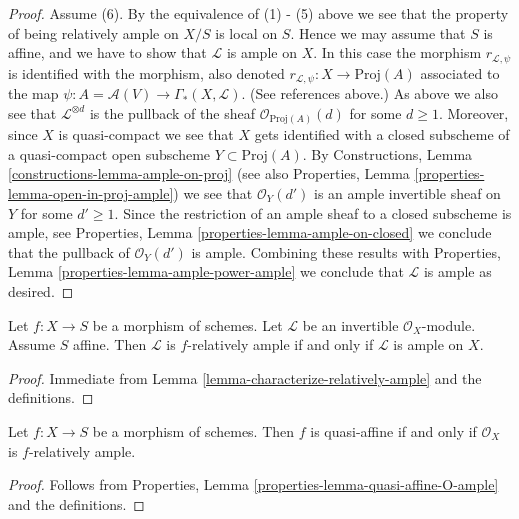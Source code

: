\begin{proof}
\medskip\noindent
Assume (6). By the equivalence of (1) - (5) above we see that the
property of being relatively ample on $X/S$ is local on $S$. Hence
we may assume that $S$ is affine, and we have to show that
$\mathcal{L}$ is ample on $X$. In this case the morphism
$r_{\mathcal{L}, \psi}$ is identified with the morphism, also denoted
$r_{\mathcal{L}, \psi} : X \to \text{Proj}(A)$ associated to the map
$\psi : A = \mathcal{A}(V) \to \Gamma_*(X, \mathcal{L})$.
(See references above.) As above we also see that
$\mathcal{L}^{\otimes d}$ is the pullback of the sheaf
$\mathcal{O}_{\text{Proj}(A)}(d)$ for some $d \geq 1$.
Moreover, since $X$ is quasi-compact we
see that $X$ gets identified with a closed subscheme of a
quasi-compact open subscheme $Y \subset \text{Proj}(A)$.
By
Constructions, Lemma
\ref{constructions-lemma-ample-on-proj}
(see also
Properties, Lemma
\ref{properties-lemma-open-in-proj-ample})
we see that $\mathcal{O}_Y(d')$ is an ample invertible sheaf on
$Y$ for some $d' \geq 1$. Since the restriction of an ample
sheaf to a closed subscheme is ample, see
Properties, Lemma
\ref{properties-lemma-ample-on-closed}
we conclude that the pullback of
$\mathcal{O}_Y(d')$ is ample. Combining these results with
Properties, Lemma
\ref{properties-lemma-ample-power-ample}
we conclude that $\mathcal{L}$ is ample as desired.
\end{proof}

\begin{lemma}
\label{lemma-ample-over-affine}
Let $f : X \to S$ be a morphism of schemes.
Let $\mathcal{L}$ be an invertible $\mathcal{O}_X$-module.
Assume $S$ affine.
Then $\mathcal{L}$ is $f$-relatively ample if and only
if $\mathcal{L}$ is ample on $X$.
\end{lemma}

\begin{proof}
Immediate from Lemma \ref{lemma-characterize-relatively-ample}
and the definitions.
\end{proof}

\begin{lemma}
\label{lemma-quasi-affine-O-ample}
Let $f : X \to S$ be a morphism of schemes. Then $f$ is quasi-affine
if and only if $\mathcal{O}_X$ is $f$-relatively ample.
\end{lemma}

\begin{proof}
Follows from Properties, Lemma \ref{properties-lemma-quasi-affine-O-ample}
and the definitions.
\end{proof}

